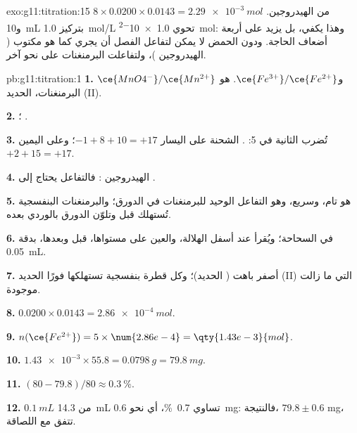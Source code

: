 \begin{solution}{exo:g11:titration:15}
$8 \times 0.0200 \times 0.0143 = \qty{2.29e-3}{mol}$ من  الهيدروجين.
و\qty{10}{mL} بتركيز \qty{1.0}{mol/L} تحوي \qty{1.0e-2}{mol}: وهذا يكفي، بل
يزيد على أربعة أضعاف الحاجة. ودون الحمض لا يمكن لتفاعل الفصل أن
يجري كما هو مكتوب ( الهيدروجين )، ولتفاعلت البرمنغنات
على نحو آخر.
\end{solution}

\begin{solution}{pb:g11:titration:1}
\textbf{1.} $\ce{MnO4^-}/\ce{Mn^{2+}}$ و$\ce{Fe^{3+}}/\ce{Fe^{2+}}$. 
هو  البرمنغنات،   الحديد (II).

\textbf{2.} ؛
.

\textbf{3.} تُضرب الثانية في 5:
. الشحنة على
اليسار $-1 + 8 + 10 = +17$؛ وعلى اليمين $+2 + 15 = +17$.

\textbf{4.}  الهيدروجين : فالتفاعل يحتاج إلى .

\textbf{5.} هو تام، وسريع، وهو التفاعل الوحيد للبرمنغنات
في الدورق؛ والبرمنغنات البنفسجية تُستهلك قبل 
وتلوّن الدورق بالوردي بعده.

\textbf{6.} في السحاحة؛ ويُقرأ عند أسفل الهلالة، والعين على مستواها،
قبل  وبعدها، بدقة \qty{0.05}{mL}.

\textbf{7.} أصفر باهت ( الحديد)؛ وكل قطرة بنفسجية تستهلكها فورًا
 الحديد (II) التي ما زالت موجودة.

\textbf{8.} $0.0200 \times 0.0143 = \qty{2.86e-4}{mol}$.

\textbf{9.} $n(\ce{Fe^{2+}}) = 5 \times \num{2.86e-4} =
\qty{1.43e-3}{mol}$.

\textbf{10.} $\num{1.43e-3} \times 55.8 = \qty{0.0798}{g} =
\qty{79.8}{mg}$.

\textbf{11.} $(80 - 79.8)/80 \approx \qty{0.3}{\percent}$.

\textbf{12.} $\qty{0.1}{mL}$ من \qty{14.3}{mL} تساوي \qty{0.7}{\percent}،
أي نحو \qty{0.6}{mg}: فالنتيجة، $79.8 \pm 0.6$ mg، تتفق مع
اللصاقة.


\end{solution}
